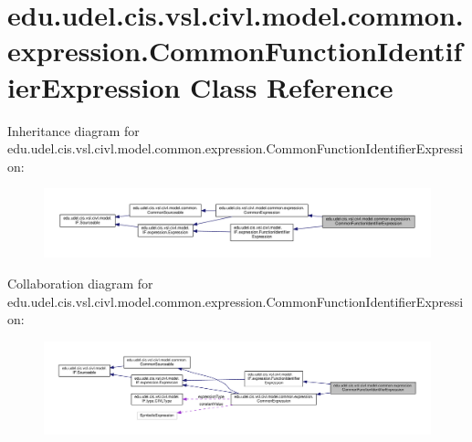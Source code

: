 \hypertarget{classedu_1_1udel_1_1cis_1_1vsl_1_1civl_1_1model_1_1common_1_1expression_1_1CommonFunctionIdentifierExpression}{}\section{edu.\+udel.\+cis.\+vsl.\+civl.\+model.\+common.\+expression.\+Common\+Function\+Identifier\+Expression Class Reference}
\label{classedu_1_1udel_1_1cis_1_1vsl_1_1civl_1_1model_1_1common_1_1expression_1_1CommonFunctionIdentifierExpression}


Inheritance diagram for edu.\+udel.\+cis.\+vsl.\+civl.\+model.\+common.\+expression.\+Common\+Function\+Identifier\+Expression\+:
\nopagebreak
\begin{figure}[H]
\begin{center}
\leavevmode
\includegraphics[width=350pt]{classedu_1_1udel_1_1cis_1_1vsl_1_1civl_1_1model_1_1common_1_1expression_1_1CommonFunctionIdentifierExpression__inherit__graph}
\end{center}
\end{figure}


Collaboration diagram for edu.\+udel.\+cis.\+vsl.\+civl.\+model.\+common.\+expression.\+Common\+Function\+Identifier\+Expression\+:
\nopagebreak
\begin{figure}[H]
\begin{center}
\leavevmode
\includegraphics[width=350pt]{classedu_1_1udel_1_1cis_1_1vsl_1_1civl_1_1model_1_1common_1_1expression_1_1CommonFunctionIdentifierExpression__coll__graph}
\end{center}
\end{figure}
